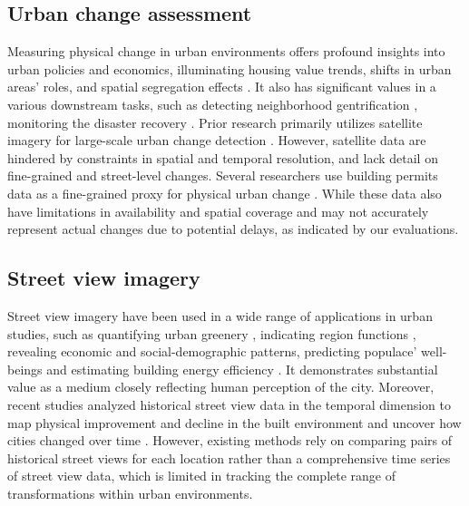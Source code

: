 \documentclass[letterpaper]{article} %
\begin{document}
\subsection{Urban change assessment}
Measuring physical change in urban environments offers profound insights into urban policies and economics, illuminating housing value trends, shifts in urban areas' roles, and spatial segregation effects \cite{Temkin1996NeighborhoodCA,Hwang2020UnequalDG}. It also has significant values in a various downstream tasks, such as detecting neighborhood gentrification \cite{hwang_gentrification}, monitoring the disaster recovery \cite{Stevenson2010UsingBP}. Prior research primarily utilizes satellite imagery for large-scale urban change detection \cite{Pandey2015UrbanizationAA,Daudt2018UrbanCD}. However, satellite data are hindered by constraints in spatial and temporal resolution, and lack detail on fine-grained and street-level changes. Several researchers use building permits data as a fine-grained proxy for physical urban change \cite{Stevenson2010UsingBP,Strauss2013DoesHD}. While these data also have limitations in availability and spatial coverage and may not accurately represent actual changes due to potential delays, as indicated by our evaluations.

\subsection{Street view imagery}
Street view imagery have been used in a wide range of applications in urban studies, such as quantifying urban greenery \cite{Li2015AssessingSU}, indicating region functions \cite{Gong2019ClassifyingSS}, revealing economic and social-demographic patterns\cite{gebru2017using,wang2020urban2vec,tian2021}, predicting populace' well-beings \cite{Lee2021PredictingLI} and estimating building energy efficiency \cite{MAYER2023120542}.
It demonstrates substantial value as a medium closely reflecting human perception of the city.
Moreover, recent studies analyzed historical street view data in the temporal dimension to map physical improvement and decline in the built environment and uncover how cities changed over time \cite{Naik2014StreetscoreP,Naik7571,Huang2022DetectingNG}. However, existing methods rely on comparing pairs of historical street views for each location rather than a comprehensive time series of street view data, which is limited in tracking the complete range of transformations within urban environments.
\end{document}
